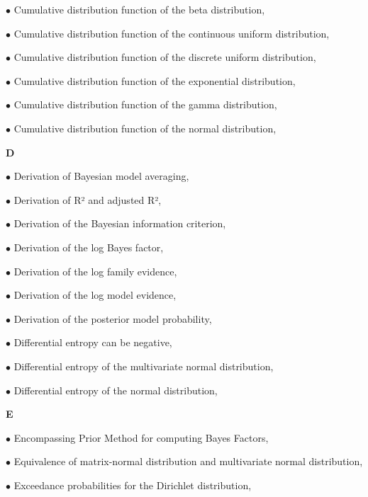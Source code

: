 \documentclass[a4paper,12pt,twoside]{book}
\begin{document}
$\bullet$ Cumulative distribution function of the beta distribution, \pageref{sec:beta-cdf}

$\bullet$ Cumulative distribution function of the continuous uniform distribution, \pageref{sec:cuni-cdf}

$\bullet$ Cumulative distribution function of the discrete uniform distribution, \pageref{sec:duni-cdf}

$\bullet$ Cumulative distribution function of the exponential distribution, \pageref{sec:exp-cdf}

$\bullet$ Cumulative distribution function of the gamma distribution, \pageref{sec:gam-cdf}

$\bullet$ Cumulative distribution function of the normal distribution, \pageref{sec:norm-cdf}


\vspace{1em}
\textbf{D}

$\bullet$ Derivation of Bayesian model averaging, \pageref{sec:bma-der}

$\bullet$ Derivation of R² and adjusted R², \pageref{sec:rsq-der}

$\bullet$ Derivation of the Bayesian information criterion, \pageref{sec:bic-der}

$\bullet$ Derivation of the log Bayes factor, \pageref{sec:lbf-der}

$\bullet$ Derivation of the log family evidence, \pageref{sec:lfe-der}

$\bullet$ Derivation of the log model evidence, \pageref{sec:lme-der}

$\bullet$ Derivation of the posterior model probability, \pageref{sec:pmp-der}

$\bullet$ Differential entropy can be negative, \pageref{sec:dent-neg}

$\bullet$ Differential entropy of the multivariate normal distribution, \pageref{sec:mvn-dent}

$\bullet$ Differential entropy of the normal distribution, \pageref{sec:norm-dent}


\vspace{1em}
\textbf{E}

$\bullet$ Encompassing Prior Method for computing Bayes Factors, \pageref{sec:bf-ep}

$\bullet$ Equivalence of matrix-normal distribution and multivariate normal distribution, \pageref{sec:matn-mvn}

$\bullet$ Exceedance probabilities for the Dirichlet distribution, \pageref{sec:dir-ep}
\end{document}

